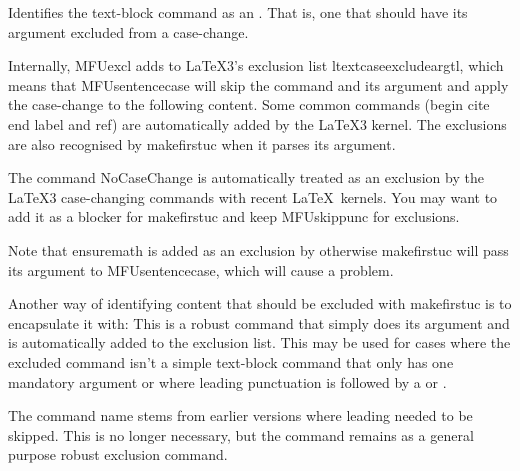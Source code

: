 \documentclass[titlepage=false,oneside,
 fontsize=12pt,captions=tableheading]{scrbook}
\begin{document}
Identifies the text-block command  as
an . That is, one that should have its argument
excluded from a case-change.

Internally, \gls{MFUexcl} adds  to \LaTeX3's exclusion list
\gls{ltextcaseexcludeargtl}, which means that \gls{MFUsentencecase}
will skip the command and its argument and apply the case-change to
the following content. Some common commands (\gls{begin} \gls{cite}
\gls{end} \gls{label} and \gls{ref}) are automatically added by the
\LaTeX3 kernel.
The exclusions are also recognised by \gls{makefirstuc} when it
parses its argument.

\begin{information}
The command \gls{NoCaseChange} is automatically treated as an
exclusion by the \LaTeX3 case-changing commands with recent \LaTeX\
kernels. You may want to add it as a blocker for \gls{makefirstuc}
and keep \gls{MFUskippunc} for exclusions.

Note that \gls{ensuremath} is added as an exclusion by  otherwise
\gls{makefirstuc} will pass its argument to \gls{MFUsentencecase},
which will cause a problem.
\end{information}

Another way of identifying content that should be excluded with
\gls{makefirstuc} is to encapsulate it with:
This is a robust command that simply does its argument and is
automatically added to the exclusion list. This may be used for
cases where the excluded command isn't a simple text-block command
that only has one mandatory argument or where leading punctuation is
followed by a \idx{blocker} or \idx{mapping}.

The command name stems from earlier versions where leading
 needed to be skipped. This is no longer necessary,
but the command remains as a general purpose robust exclusion command.
\end{document}
